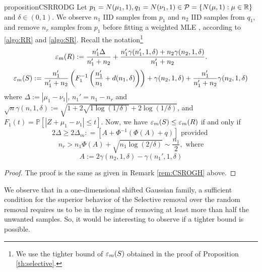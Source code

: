\begin{restatable}{proposition}{CSRRODG}
\label{th:CSRRODG}
Let $p_1=N(\mu_1,1), q_1= N(\nu_1,1) \in \mathcal{P}= \{N(\mu,1): \mu \in \mathbb{R}\}$ and $\delta \in (0,1)$. We observe $n_1$ IID samples from $p_1$ and $n_2$ IID samples from $q_1$, and remove $n_r$ samples from $p_1$ before fitting a weighted MLE , according to \ref{algo:RR} and \ref{algo:SR}. Recall the notation\footnote{We use the tighter bound of $\varepsilon_m(S)$ obtained in the proof of Proposition \ref{th:selective}.}
\begin{align*}
 \varepsilon_m(R):= \frac{n_1'  \Delta }{n_1' + n_2} + \frac{n_1' \gamma(n_1',1,\delta) + n_2 \gamma(n_2, 1,\delta) }{n_1' + n_2}.
\end{align*}
\begin{align*}
\varepsilon_m(S)
:=\frac{n_1'}{n_1'+n_2}\left(F_1^{-1}\left(\frac{n_1'}{n_1} +d(n_1, \delta)\right)\right)
    + 
 \gamma(n_2,1,\delta) + \frac{n_1'}{n_1'+n_2} \gamma(n_2,1,\delta)
\end{align*}
where $\Delta := |\mu_1- \nu_1|$, $n_1'= n_1- n_r$ and $\sqrt{n} \gamma(n, 1, \delta):= \sqrt{1+2\sqrt{1 \log (1/\delta)} + 2 \log (1/\delta)}$, and $F_1(t)= \mathbb{P}[|Z + \mu_1-\nu_1| \leq t]$.  
Now,  we have $\varepsilon_m(S)\leq \varepsilon_m(R)$ if and only if 
\begin{equation} \label{eq:Delta_m}
    2\Delta 
\geq 
2\Delta_{m}:
=
\left[
A+
\Phi^{-1}\!\left(\Phi(A)+q\right)
\right] \text{ provided }
\end{equation} 
\begin{equation} \label{eq:n_r}
n_r
>
n_1
\Phi(A)
+
\sqrt{n_1\log(2/\delta)}
\sim \frac{n_1}{2}, \text{ where}
\end{equation}
\begin{equation}
    A :=  2 \gamma(n_2,1,\delta)-\gamma(n_1',1,\delta)
\end{equation}
\end{restatable}
\begin{proof}
    The proof is the same as given in Remark \ref{rem:CSROGH} above.
\end{proof}

\begin{remark}
    We observe that in a one-dimensional shifted Gaussian family, a sufficient condition for the superior behavior of the Selective removal over the random removal requires us to be in the regime of removing at least more than half the unwanted samples. So, it would be interesting to observe if a tighter bound is possible.
\end{remark}




